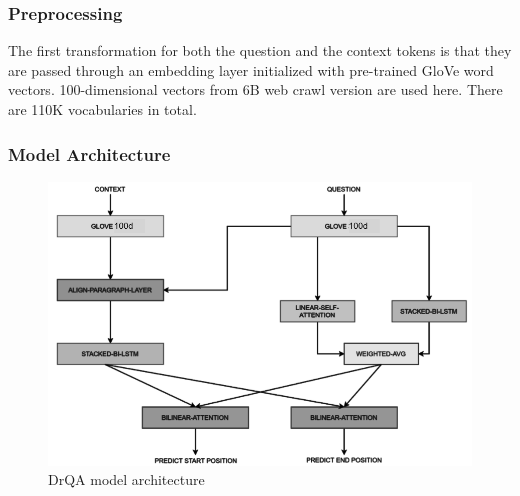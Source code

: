 \subsubsection{Preprocessing}

The first transformation for both the question and the context tokens is that they are passed through an embedding layer initialized with pre-trained GloVe word vectors. 100-dimensional vectors from 6B web crawl version are used here. There are 110K vocabularies in total. 


\subsubsection{Model Architecture}

\begin{figure}[!t]
    \centering
    \includegraphics[width=\linewidth]{img/DrQA.png}
    \caption{DrQA model architecture}
    \label{fig:DrQA}
\end{figure}

